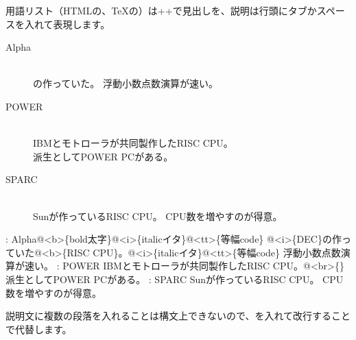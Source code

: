 用語リスト（HTMLの、TeXの）は+\reviewtt{:}+で見出しを、説明は行頭にタブかスペースを入れて表現します。

\begin{description}
\item[Alpha\protect\footnotemark{}] \mbox{} \\
の作っていた。
浮動小数点数演算が速い。
\item[POWER] \mbox{} \\
IBMとモトローラが共同製作したRISC CPU。\\
派生としてPOWER PCがある。
\item[SPARC] \mbox{} \\
Sunが作っているRISC CPU。
CPU数を増やすのが得意。
\end{description}


\begin{reviewlistblock}
\begin{reviewemlist}

 : Alpha@\textless{}b\textgreater{}\{bold太字\}@\textless{}i\textgreater{}\{italicイタ\}@\textless{}tt\textgreater{}\{等幅code\}
        @\textless{}i\textgreater{}\{DEC\}の作っていた@\textless{}b\textgreater{}\{RISC CPU\}。@\textless{}i\textgreater{}\{italicイタ\}@\textless{}tt\textgreater{}\{等幅code\}
        浮動小数点数演算が速い。
 : POWER
        IBMとモトローラが共同製作したRISC CPU。@\textless{}br\textgreater{}\{\}
        派生としてPOWER PCがある。
 : SPARC
        Sunが作っているRISC CPU。
        CPU数を増やすのが得意。
\end{reviewemlist}
\end{reviewlistblock}

説明文に複数の段落を入れることは構文上できないので、を入れて改行することで代替します。
